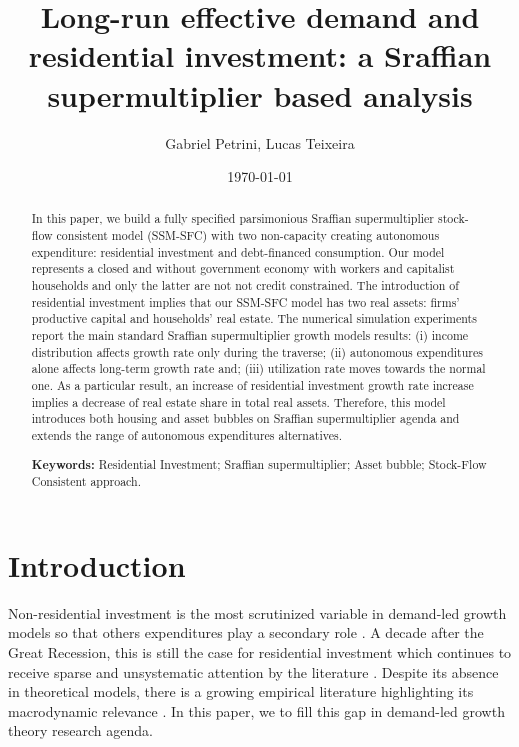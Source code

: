 \documentclass[11pt]{article}
\author{Gabriel Petrini, Lucas Teixeira}
\date{\today}
\title{Long-run effective demand and residential investment: a Sraffian supermultiplier based analysis}
\begin{document}
\maketitle
\begin{abstract}
In this paper, we build a fully specified parsimonious Sraffian supermultiplier stock-flow consistent model (SSM-SFC) with two non-capacity creating autonomous expenditure: residential investment and debt-financed consumption.
Our model represents a closed and without government economy with workers and capitalist households and only the latter are not not credit constrained.
The introduction of residential investment implies that our SSM-SFC model has two real assets: firms' productive capital and households' real estate.
The numerical simulation experiments report the main standard Sraffian supermultiplier growth models results: 
    (i) income distribution affects growth rate only during the traverse;
    (ii) autonomous expenditures alone affects long-term growth rate and;
    (iii)  utilization rate moves towards the normal one.
As a particular result, an increase of residential investment growth rate increase implies a decrease of real estate share in total real assets.
Therefore, this model introduces both housing and asset bubbles	on Sraffian supermultiplier agenda and extends the range of autonomous expenditures alternatives.

\noindent \textbf{Keywords:} Residential Investment; Sraffian supermultiplier; Asset bubble;  Stock-Flow Consistent approach.
\end{abstract}


\section{Introduction}
\label{sec:orgaa44836}
\label{sec:introduction}

Non-residential investment is the most scrutinized variable in demand-led growth models so that others expenditures play a secondary role \cite{brochier_macroeconomics_2017}.
A decade after the Great Recession, this is still the case for residential investment which continues to receive sparse and unsystematic attention by the literature \cites{caverzasi_stock-flow_2013}{nikolaidi_minsky_2017}.
Despite its absence in theoretical models, there is a growing empirical literature highlighting its macrodynamic relevance \cites{leamer_housing_2007}{jorda_great_2014}{fiebiger_semi-autonomous_2018}{fiebiger_trend_2017}.
In this paper, we to fill this gap in demand-led growth theory research agenda.
\end{document}
